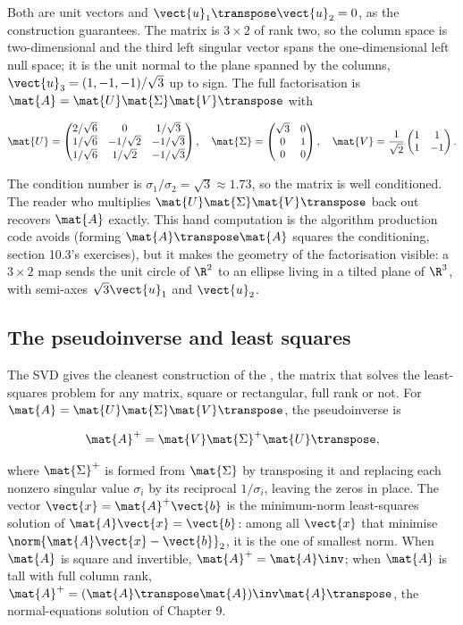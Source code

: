 Both are unit vectors and $\vect{u}_{1}\transpose \vect{u}_{2} = 0$,
as the construction guarantees. The matrix is $3 \times 2$ of rank
two, so the column space is two-dimensional and the third left
singular vector spans the one-dimensional left null space; it is the
unit normal to the plane spanned by the columns,
$\vect{u}_{3} = (1, -1, -1)/\sqrt{3}$ up to sign. The full
factorisation is $\mat{A} = \mat{U} \mat{\Sigma} \mat{V}\transpose$
with

\[
\mat{U} = \begin{pmatrix} 2/\sqrt{6} & 0 & 1/\sqrt{3} \\
1/\sqrt{6} & -1/\sqrt{2} & -1/\sqrt{3} \\
1/\sqrt{6} & 1/\sqrt{2} & -1/\sqrt{3} \end{pmatrix}, \quad
\mat{\Sigma} = \begin{pmatrix} \sqrt{3} & 0 \\ 0 & 1 \\ 0 & 0
\end{pmatrix}, \quad
\mat{V} = \frac{1}{\sqrt{2}} \begin{pmatrix} 1 & 1 \\ 1 & -1
\end{pmatrix}.
\]

The condition number is $\sigma_{1}/\sigma_{2} = \sqrt{3} \approx
1.73$, so the matrix is well conditioned. The reader who multiplies
$\mat{U} \mat{\Sigma} \mat{V}\transpose$ back out recovers $\mat{A}$
exactly. This hand computation is the algorithm production code
avoids (forming $\mat{A}\transpose \mat{A}$ squares the
conditioning, section 10.3's exercises), but it makes the geometry
of the factorisation visible: a $3 \times 2$ map sends the unit
circle of $\R^{2}$ to an ellipse living in a tilted plane of
$\R^{3}$, with semi-axes $\sqrt{3}\vect{u}_{1}$ and $\vect{u}_{2}$.

\subsection{The pseudoinverse and least squares}

The SVD gives the cleanest construction of the
, the matrix that solves the
least-squares problem for any matrix, square or rectangular, full
rank or not. For $\mat{A} = \mat{U} \mat{\Sigma} \mat{V}\transpose$,
the pseudoinverse is

\[
\mat{A}^{+} = \mat{V} \mat{\Sigma}^{+} \mat{U}\transpose,
\]

where $\mat{\Sigma}^{+}$ is formed from $\mat{\Sigma}$ by
transposing it and replacing each nonzero singular value
$\sigma_{i}$ by its reciprocal $1/\sigma_{i}$, leaving the zeros in
place. The vector $\vect{x} = \mat{A}^{+} \vect{b}$ is the
minimum-norm least-squares solution of $\mat{A} \vect{x} =
\vect{b}$: among all $\vect{x}$ that minimise $\norm{\mat{A}\vect{x}
- \vect{b}}_{2}$, it is the one of smallest norm. When $\mat{A}$ is
square and invertible, $\mat{A}^{+} = \mat{A}\inv$; when $\mat{A}$
is tall with full column rank, $\mat{A}^{+} = (\mat{A}\transpose
\mat{A})\inv \mat{A}\transpose$, the normal-equations solution of
Chapter 9.

